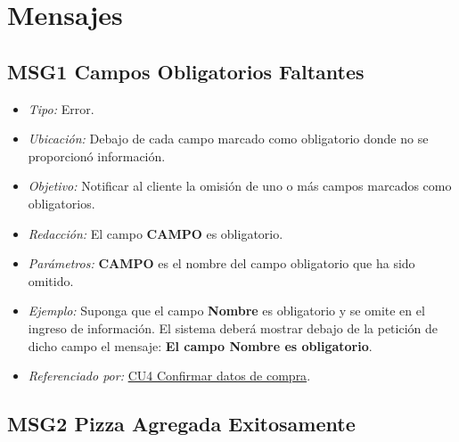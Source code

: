 
\pagebreak
\section{Mensajes}

	\hypertarget{MSG1:CamposObligatorios}{}
	\subsection{MSG1 Campos Obligatorios Faltantes}

		\begin{itemize}

			\item \textit{Tipo:} Error.

			\item\textit{Ubicación:}  Debajo de cada campo marcado como obligatorio donde no se proporcionó información.

			\item \textit{Objetivo:} Notificar al cliente la omisión de uno o más campos marcados como obligatorios.

			\item \textit{Redacción:} El campo \textbf{CAMPO} es obligatorio.

			\item \textit{Parámetros:} \textbf{CAMPO} es el nombre del campo obligatorio que ha sido omitido.

			\item \textit{Ejemplo:} Suponga que el campo \textbf{Nombre} es obligatorio y se omite en el ingreso de información. El sistema deberá mostrar debajo de la petición de dicho campo el mensaje: \textbf{El campo Nombre es obligatorio}.

			\item \textit{Referenciado por:} \hyperlink{CU4}{CU4 Confirmar datos de compra}.

		\end{itemize}
	
\hypertarget{MSG2:PizzaAgregada}{}
\subsection{MSG2 Pizza Agregada Exitosamente}

